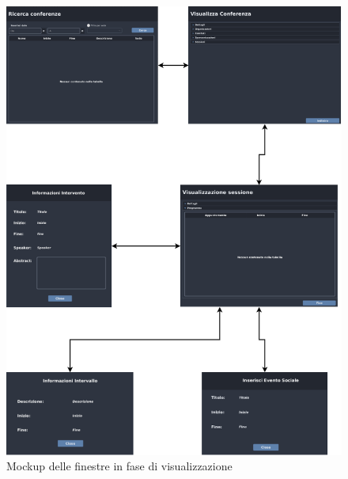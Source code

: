 \begin{figure}[h!]
	\centering
	\includegraphics[scale=0.5]{Immagini/Mockup/View/Visualizza_Flow.png}
	\caption{Mockup delle finestre in fase di visualizzazione}
\end{figure}

